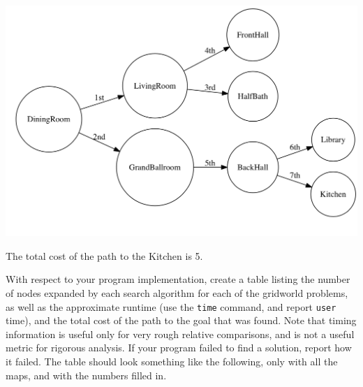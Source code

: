 \documentclass[12pt]{article}
\newcommand{\ttt}[1]{\texttt{#1}}
\newenvironment{questionList}{
\newcounter{ctr}
\begin{list}{\textbf{Question \arabic{ctr}.} \\ \\ }
  {\usecounter{ctr}}
  }{
\end{list}
}
\begin{document}
\begin{questionList}
\includegraphics[scale=.4]{./images/UCS.png}

The total cost of the path to the Kitchen is 5. 


\item
With respect to your program implementation, create a table listing the
number of nodes expanded by each search algorithm for each of the gridworld
problems, as well as the approximate runtime (use the \ttt{time} command, and
report \ttt{user} time), and the total cost of the path to the goal that was
found.  Note that timing information is useful only for very rough
relative comparisons, and is not a useful metric for rigorous analysis.  If your
program failed to find a solution, report how it failed.
The table should look something like the following, only with all the maps, and
with the numbers filled in.


\end{questionList}
\end{document}
